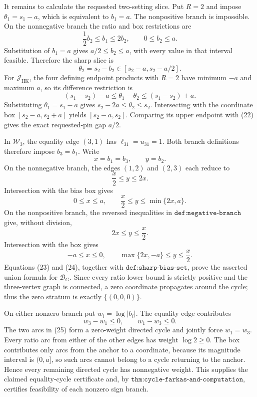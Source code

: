 It remains to calculate the requested two-setting slice.  Put \(R=2\) and impose \(\theta_1=s_1-a\), which is equivalent to \(b_1=a\).  The nonpositive branch is impossible.  On the nonnegative branch the ratio and box restrictions are
\[
 \frac12 b_2\le b_1\le2b_2,
 \qquad 0\le b_2\le a.
\]
Substitution of \(b_1=a\) gives \(a/2\le b_2\le a\), with every value in that interval feasible.  Therefore the sharp slice is
\[
 \theta_2=s_2-b_2\in[s_2-a,s_2-a/2].
\tag{22}
\]
For \(\mathcal J_{\mathrm{HK}}\), the four defining endpoint products with \(R=2\) have minimum \(-a\) and maximum \(a\), so its difference restriction is
\[
 (s_1-s_2)-a\le\theta_1-\theta_2\le(s_1-s_2)+a.
\]
Substituting \(\theta_1=s_1-a\) gives \(s_2-2a\le\theta_2\le s_2\).  Intersecting with the coordinate box \([s_2-a,s_2+a]\) yields \([s_2-a,s_2]\).  Comparing its upper endpoint with (22) gives the exact requested-pin gap \(a/2\).

In \(\mathcal W_3\), the equality edge \((3,1)\) has \(\ell_{31}=u_{31}=1\).  Both branch definitions therefore impose \(b_3=b_1\).  Write
\[
 x=b_1=b_3,
 \qquad y=b_2.
\]
On the nonnegative branch, the edges \((1,2)\) and \((2,3)\) each reduce to
\[
 \frac{x}{2}\le y\le2x.
\]
Intersection with the bias box gives
\[
 0\le x\le a,
 \qquad
 \frac{x}{2}\le y\le\min\{2x,a\}.
\tag{23}
\]
On the nonpositive branch, the reversed inequalities in \(\texttt{def:negative-branch}\) give, without division,
\[
 2x\le y\le\frac{x}{2}.
\]
Intersection with the box gives
\[
 -a\le x\le0,
 \qquad
 \max\{2x,-a\}\le y\le\frac{x}{2}.
\tag{24}
\]
Equations (23) and (24), together with \(\texttt{def:sharp-bias-set}\), prove the asserted union formula for \(\mathcal B_G\).  Since every ratio lower bound is strictly positive and the three-vertex graph is connected, a zero coordinate propagates around the cycle; thus the zero stratum is exactly \(\{(0,0,0)\}\).

On either nonzero branch put \(w_i=\log|b_i|\).  The equality edge contributes
\[
 w_3-w_1\le0,
 \qquad
 w_1-w_3\le0.
\tag{25}
\]
The two arcs in (25) form a zero-weight directed cycle and jointly force \(w_1=w_3\).  Every ratio arc from either of the other edges has weight \(\log2\ge0\).  The box contributes only arcs from the anchor to a coordinate, because its magnitude interval is \((0,a]\), so such arcs cannot belong to a cycle returning to the anchor.  Hence every remaining directed cycle has nonnegative weight.  This supplies the claimed equality-cycle certificate and, by \(\texttt{thm:cycle-farkas-and-computation}\), certifies feasibility of each nonzero sign branch.

